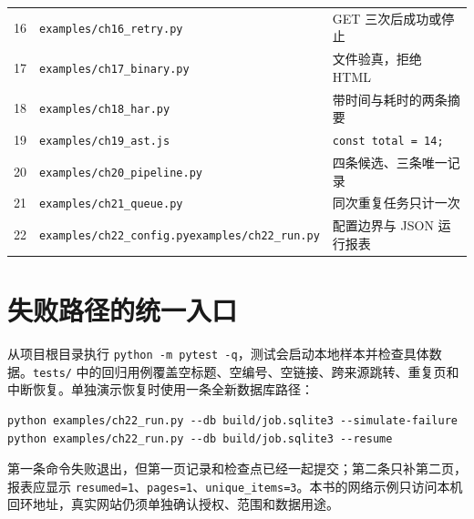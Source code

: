 \begin{longtable}{@{}p{}p{}p{}@{}}
16 & \texttt{examples/ch16\_retry.py} & GET 三次后成功或停止\\
17 & \texttt{examples/ch17\_binary.py} & 文件验真，拒绝 HTML\\
18 & \texttt{examples/ch18\_har.py} & 带时间与耗时的两条摘要\\
19 & \texttt{examples/ch19\_ast.js} & \texttt{const total = 14;}\\
20 & \texttt{examples/ch20\_pipeline.py} & 四条候选、三条唯一记录\\
21 & \texttt{examples/ch21\_queue.py} & 同次重复任务只计一次\\
22 & \texttt{examples/ch22\_config.py}\newline\texttt{examples/ch22\_run.py} & 配置边界与 JSON 运行报表\\
\bottomrule
\end{longtable}
\endgroup

\section*{失败路径的统一入口}
从项目根目录执行 \texttt{python -m pytest -q}，测试会启动本地样本并检查具体数据。\texttt{tests/} 中的回归用例覆盖空标题、空编号、空链接、跨来源跳转、重复页和中断恢复。单独演示恢复时使用一条全新数据库路径：
\begin{Verbatim}[numbers=none]
python examples/ch22_run.py --db build/job.sqlite3 --simulate-failure
python examples/ch22_run.py --db build/job.sqlite3 --resume
\end{Verbatim}
第一条命令失败退出，但第一页记录和检查点已经一起提交；第二条只补第二页，报表应显示 \texttt{resumed=1}、\texttt{pages=1}、\texttt{unique\_items=3}。本书的网络示例只访问本机回环地址，真实网站仍须单独确认授权、范围和数据用途。
